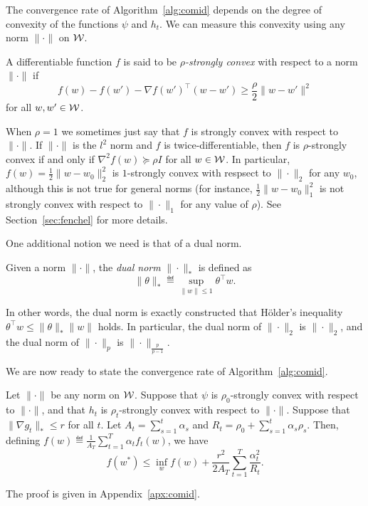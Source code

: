 \documentclass[paper.tex]{subfiles}
\begin{document}
The convergence rate of Algorithm~\ref{alg:comid} depends on the degree of 
convexity of the functions $\psi$ and $h_t$. We can measure this convexity 
using any norm $\|\cdot\|$ on $\mathcal{W}$.
\begin{definition}
A differentiable function $f$ is said to be \emph{$\rho$-strongly convex} with 
respect to a norm $\|\cdot\|$ if
\[ f(w) - f(w') - \nabla f(w')^{\top}(w - w') \geq \frac{\rho}{2}\|w-w'\|^2 \]
for all $w, w' \in \mathcal{W}$.
\end{definition}
When $\rho = 1$ we sometimes just say that $f$ is strongly convex with respect to $\|\cdot\|$.
If $\|\cdot\|$ is the $l^2$ norm and $f$ is twice-differentiable, then $f$ is $\rho$-strongly 
convex if and only if $\nabla^2 f(w) \succeq \rho I$ for all $w \in \mathcal{W}$. In particular, 
$f(w) = \frac{1}{2}\|w - w_0\|_2^2$ is $1$-strongly convex with respsect to $\|\cdot\|_2$ for 
any $w_0$, although this is not true for general norms (for instance, 
$\frac{1}{2}\|w-w_0\|_1^2$ is not strongly convex with respect to $\|\cdot\|_1$ for any value 
of $\rho$). See Section~\ref{sec:fenchel} for more details.

One additional notion we need is that of a dual norm.
\begin{definition}
Given a norm $\|\cdot\|$, the \emph{dual norm} $\|\cdot\|_*$ is defined as 
\[ \|\theta\|_* \eqdef \sup_{\|w\| \leq 1} \theta^{\top}w. \]
\end{definition}
In other words, the dual norm is exactly constructed that H\"{o}lder's 
inequality $\theta^{\top}w \leq \|\theta\|_* \|w\|$ holds. In particular, 
the dual norm of $\|\cdot\|_2$ is $\|\cdot\|_2$, and the dual norm of 
$\|\cdot\|_p$ is $\|\cdot\|_{\frac{p}{p-1}}$.

We are now ready to state the convergence rate of Algorithm~\ref{alg:comid}.
\begin{theorem}
\label{thm:comid}
Let $\|\cdot\|$ be any norm on $\mathcal{W}$. Suppose that $\psi$ is $\rho_0$-strongly convex 
with respect to $\|\cdot\|$, and that $h_t$ is $\rho_t$-strongly convex with respect 
to $\|\cdot\|$. Suppose that $\|\nabla g_t\|_* \leq r$ for all $t$. Let 
$A_t = \sum_{s=1}^t \alpha_s$ and $R_t = \rho_0 + \sum_{s=1}^t \alpha_s \rho_s$. 
Then, defining $f(w) \eqdef \frac{1}{A_T} \sum_{t=1}^{T} \alpha_t f_t(w)$, we have
\[ f(w^*) \leq \inf_{w} f(w) + \frac{r^2}{2A_T} \sum_{t=1}^T \frac{\alpha_t^2}{R_t}. \]
\end{theorem}
The proof is given in Appendix~\ref{apx:comid}.
\end{document}
